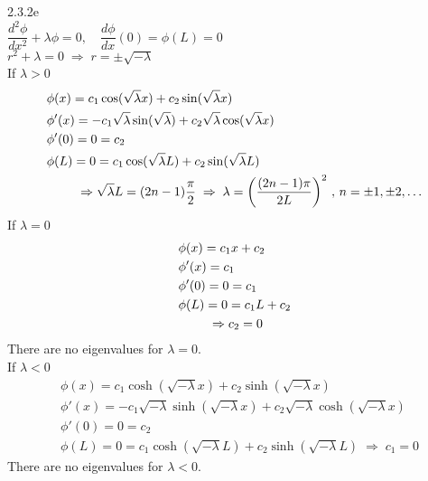 \documentclass{article}
\theoremstyle{definition}
\begin{document}
    \begin{prob}{2.3.2e} $ $  \vspace{2mm} \\
    	$ \dfrac{d^2 \phi}{dx^2} + \lambda \phi = 0, \quad \dfrac{d\phi}{dx}(0) = \phi(L) = 0 $ \\
    	
    	$ r^2 + \lambda = 0 \; \Rightarrow \; r = \pm \sqrt{-\lambda} $ \\
    	
    	If $ \lambda > 0 $
    	\begin{align*}
    		& \phi(x) = c_1\cos(\sqrt{\lambda} x) + c_2\sin(\sqrt{\lambda} x) \\
    		& \phi'(x) = -c_1\sqrt{\lambda} \sin(\sqrt{\lambda}) + c_2\sqrt{\lambda} \cos(\sqrt{\lambda} x) \\
    		& \phi'(0) = 0 = c_2 \\
    		& \phi(L) = 0 = c_1\cos(\sqrt{\lambda} L) + c_2\sin(\sqrt{\lambda} L) \\
    		& \hspace{0.84cm}  \Rightarrow \sqrt{\lambda}L = (2n-1)\frac{\pi}{2} \; \Rightarrow \; \lambda = \left( \frac{(2n-1)\pi}{2L} \right)^2 \, , \, n = \pm 1, \pm 2, \dots
    	\end{align*}
    	If $ \lambda = 0 $
    	\begin{align*}
    		& \phi(x) = c_1x + c_2 \\
    		& \phi'(x) = c_1 \\
    		& \phi'(0) = 0 = c_1 \\
    		& \phi(L) = 0 = c_1L + c_2 \\
    		& \hspace{0.84cm} \Rightarrow c_2 = 0
    	\end{align*}
    	There are no eigenvalues for $ \lambda = 0 $. \\
    	
    	If $ \lambda < 0 $
    	\begin{align*}
    		& \phi(x) = c_1\cosh(\sqrt{-\lambda} x) + c_2\sinh(\sqrt{-\lambda} x) \\
    		& \phi'(x) = -c_1\sqrt{-\lambda} \sinh(\sqrt{-\lambda} x) + c_2 \sqrt{-\lambda} \cosh(\sqrt{-\lambda} x) \\
    		& \phi'(0) = 0 = c_2 \\
    		& \phi(L) = 0 = c_1\cosh(\sqrt{-\lambda} L) + c_2\sinh(\sqrt{-\lambda} L) \; \Rightarrow \; c_1 = 0
    	\end{align*}
    	There are no eigenvalues for $ \lambda < 0 $.
    \end{prob}
    
\end{document}
